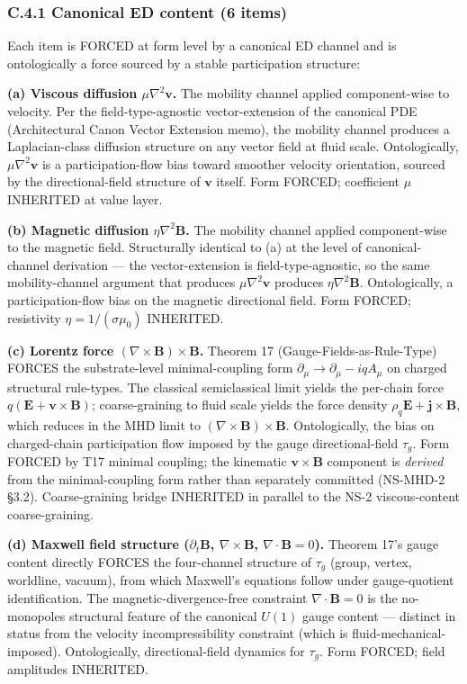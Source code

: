 \documentclass[
]{article}
\begin{document}
\subsubsection{C.4.1 Canonical ED content (6
items)}\label{c.4.1-canonical-ed-content-6-items}

Each item is FORCED at form level by a canonical ED channel and is
ontologically a force sourced by a stable participation structure:

\textbf{(a) Viscous diffusion \(\mu\nabla^2\mathbf{v}\).} The mobility
channel applied component-wise to velocity. Per the field-type-agnostic
vector-extension of the canonical PDE (Architectural Canon Vector
Extension memo), the mobility channel produces a Laplacian-class
diffusion structure on any vector field at fluid scale. Ontologically,
\(\mu\nabla^2\mathbf{v}\) is a participation-flow bias toward smoother
velocity orientation, sourced by the directional-field structure of
\(\mathbf{v}\) itself. Form FORCED; coefficient \(\mu\) INHERITED at
value layer.

\textbf{(b) Magnetic diffusion \(\eta\nabla^2\mathbf{B}\).} The mobility
channel applied component-wise to the magnetic field. Structurally
identical to (a) at the level of canonical-channel derivation --- the
vector-extension is field-type-agnostic, so the same mobility-channel
argument that produces \(\mu\nabla^2\mathbf{v}\) produces
\(\eta\nabla^2\mathbf{B}\). Ontologically, a participation-flow bias on
the magnetic directional field. Form FORCED; resistivity
\(\eta = 1/(\sigma\mu_0)\) INHERITED.

\textbf{(c) Lorentz force \((\nabla\times\mathbf{B})\times\mathbf{B}\).}
Theorem 17 (Gauge-Fields-as-Rule-Type) FORCES the substrate-level
minimal-coupling form \(\partial_\mu \to \partial_\mu - iqA_\mu\) on
charged structural rule-types. The classical semiclassical limit yields
the per-chain force \(q(\mathbf{E} + \mathbf{v}\times\mathbf{B})\);
coarse-graining to fluid scale yields the force density
\(\rho_q\mathbf{E} + \mathbf{j}\times\mathbf{B}\), which reduces in the
MHD limit to \((\nabla\times\mathbf{B})\times\mathbf{B}\).
Ontologically, the bias on charged-chain participation flow imposed by
the gauge directional-field \(\tau_g\). Form FORCED by T17 minimal
coupling; the kinematic \(\mathbf{v}\times\mathbf{B}\) component is
\emph{derived} from the minimal-coupling form rather than separately
committed (NS-MHD-2 §3.2). Coarse-graining bridge INHERITED in parallel
to the NS-2 viscous-content coarse-graining.

\textbf{(d) Maxwell field structure (\(\partial_t\mathbf{B}\),
\(\nabla\times\mathbf{B}\), \(\nabla\cdot\mathbf{B} = 0\)).} Theorem
17's gauge content directly FORCES the four-channel structure of
\(\tau_g\) (group, vertex, worldline, vacuum), from which Maxwell's
equations follow under gauge-quotient identification. The
magnetic-divergence-free constraint \(\nabla\cdot\mathbf{B} = 0\) is the
no-monopoles structural feature of the canonical \(U(1)\) gauge content
--- distinct in status from the velocity incompressibility constraint
(which is fluid-mechanical-imposed). Ontologically, directional-field
dynamics for \(\tau_g\). Form FORCED; field amplitudes INHERITED.
\end{document}
